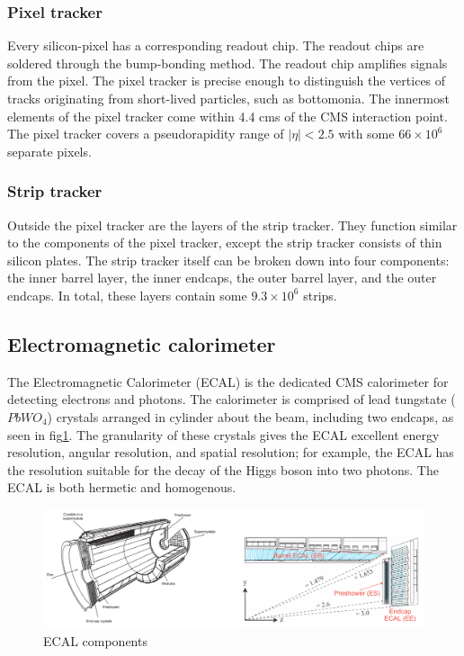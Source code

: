 \subsubsection{Pixel tracker}

Every silicon-pixel has a corresponding readout chip. The readout chips are soldered through the bump-bonding method. The readout chip amplifies signals from the pixel. The pixel tracker is precise enough to distinguish the vertices of tracks originating from short-lived particles, such as bottomonia. The innermost elements of the pixel tracker come within 4.4 cms of the CMS interaction point. The pixel tracker covers a pseudorapidity range of $|\eta|<2.5$ with some $66 \times 10^6$ separate pixels.

\subsubsection{Strip tracker}

Outside the pixel tracker are the layers of the strip tracker. They function similar to the components of the pixel tracker, except the strip tracker consists of thin silicon plates. The strip tracker itself can be broken down into four components: the inner barrel layer, the inner endcaps, the outer barrel layer, and the outer endcaps. In total, these layers contain some $9.3 \times 10^6$ strips. 

\subsection{Electromagnetic calorimeter}

The Electromagnetic Calorimeter (ECAL) is the dedicated CMS calorimeter for detecting electrons and photons. The calorimeter is comprised of lead tungstate ($PbWO_4$) crystals arranged in cylinder about the beam, including two endcaps, as seen in fig\ref{fig:ecalComp}. The granularity of these crystals gives the ECAL excellent energy resolution, angular resolution, and spatial resolution; for example, the ECAL has the resolution suitable for the decay of the Higgs boson into two photons. The ECAL is both hermetic and homogenous. 

\begin{figure}[h!]
\begin{centering}
\includegraphics[width=7in]{Chapter3/importfigs/ecal_performance_with_examples.png}
\par\end{centering}
\caption{ECAL components \label{fig:ecalComp}}
\end{figure}

